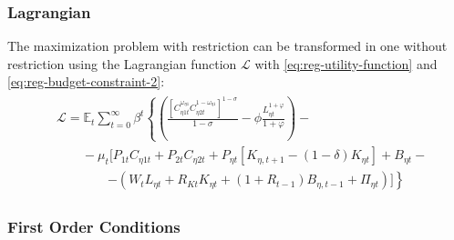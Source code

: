 \documentclass[../thesis.tex]{subfiles}
\begin{document}
\subsubsection*{Lagrangian}

The maximization problem with restriction can be transformed in one without restriction using the Lagrangian function $\mathcal{L}$ with \ref{eq:reg-utility-function} and \ref{eq:reg-budget-constraint-2}:
\begin{align}
	\begin{split}
	& \mathcal{L} = \mathbb{E}_t \sum_{t=0}^{\infty} \beta^t \left\{ \left( \frac{ \left[ C_{\eta 1 t}^{\omega_{\eta 1}} C_{\eta 2 t}^{1-\omega_{\eta 1}} \right]^{1 -\sigma}}{1 -\sigma} - \phi \frac{L_{\eta t}^{1+\varphi}}{1+\varphi} \right) \right. - \\ & \qquad - \mu_t \Big[ P_{1 t} C_{\eta 1 t} + P_{2 t} C_{\eta 2 t} + P_{\eta t} [ K_{\eta, t+1} - (1-\delta)K_{\eta t} ] + B_{\eta t} - \\ & \qquad \qquad \left. - ( W_t L_{\eta t} + R_{Kt} K_{\eta t} + (1 + R_{t-1}) B_{\eta,t-1} + \Pi_{\eta t} ) \Big] \right\} \label{eq:reg-household-lagrangian}
	\end{split}
\end{align}

\subsubsection*{First Order Conditions}
\end{document}
